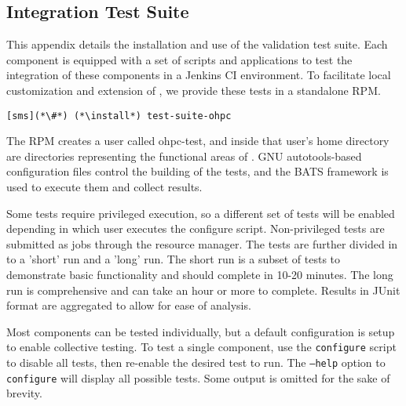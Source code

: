 \subsection{Integration Test Suite}  \label{appendix:test_suite}

This appendix details the installation and use of the \OHPC validation test
suite. Each \OHPC component is equipped with a set of scripts and applications
to test the integration of these components in a Jenkins CI 
environment. To facilitate local customization and extension of \OHPC, we 
provide these tests in a standalone RPM. 

\begin{lstlisting}
[sms](*\#*) (*\install*) test-suite-ohpc
\end{lstlisting}

The RPM creates a user called ohpc-test, and inside that user's home directory 
are directories representing the functional areas of \OHPC. GNU 
autotools-based configuration files control the building of the tests, and the
BATS framework is used to execute them and collect results. 

Some tests require privileged execution, so a different set of tests will be
enabled depending in which user executes the configure script. Non-privileged
tests are submitted as jobs through the \rms{} resource manager. The tests are
further divided in to a 'short' run and a 'long' run. The short run is a subset
of tests to demonstrate basic functionality and should complete in 10-20 
minutes. The long run is comprehensive and can take an hour or more to complete.
Results in JUnit format are aggregated to allow for ease of analysis.

Most components can be tested individually, but a default configuration is setup 
to enable collective testing. To test a single component, use the \texttt{configure}
script to disable all tests, then re-enable the desired test to run. The
\texttt{--help} option to \texttt{configure} will display all possible tests. Some 
output is omitted for the sake of brevity.

